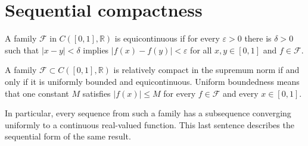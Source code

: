\section{Sequential compactness}
\begin{definition}\label{def:equicontinuity}
A family $\mathcal F$ in $C([0,1],\mathbb R)$ is equicontinuous if for
every $\varepsilon>0$ there is $\delta>0$ such that $|x-y|<\delta$ implies
$|f(x)-f(y)|<\varepsilon$ for all $x,y\in[0,1]$ and $f\in\mathcal F$.
\end{definition}
\begin{theorem}\label{thm:criterion}
A family $\mathcal F\subset C([0,1],\mathbb R)$ is relatively compact
in the supremum norm if and only if it is uniformly bounded and
equicontinuous. Uniform boundedness means that one constant $M$ satisfies
$|f(x)|\le M$ for every $f\in\mathcal F$ and every $x\in[0,1]$.
\end{theorem}
In particular, every sequence from such a family has a subsequence
converging uniformly to a continuous real-valued function.
This last sentence describes the sequential form of the same result.
